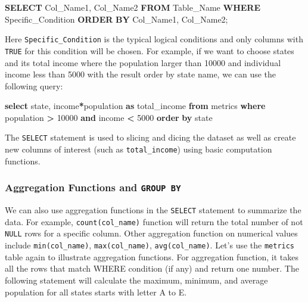 \documentclass[
  12pt,
]{krantz}
\makeatletter
\newenvironment{Shaded}{\begin{snugshade}}{\end{snugshade}}
\newcommand{\DecValTok}[1]{\textcolor[rgb]{0.06,0.06,0.06}{#1}}
\newcommand{\KeywordTok}[1]{\textcolor[rgb]{0.27,0.27,0.27}{\textbf{#1}}}
\newcommand{\NormalTok}[1]{#1}
\newcommand{\OperatorTok}[1]{\textcolor[rgb]{0.43,0.43,0.43}{\textbf{#1}}}
\newenvironment{kframe}{%
\medskip{}
\setlength{\fboxsep}{.8em}
 \def\at@end@of@kframe{}%
 \ifinner\ifhmode%
  \def\at@end@of@kframe{\end{minipage}}%
  \begin{minipage}{\columnwidth}%
 \fi\fi%
 \def\FrameCommand##1{\hskip\@totalleftmargin \hskip-\fboxsep
 \colorbox{shadecolor}{##1}\hskip-\fboxsep
     \hskip-\linewidth \hskip-\@totalleftmargin \hskip\columnwidth}%
 \MakeFramed {\advance\hsize-\width
   \@totalleftmargin\z@ \linewidth\hsize
   \@setminipage}}%
 {\par\unskip\endMakeFramed%
 \at@end@of@kframe}
\renewenvironment{Shaded}{\begin{kframe}}{\end{kframe}}
\makeatother
\begin{document}
\begin{Shaded}
\begin{Highlighting}[]
\KeywordTok{SELECT}\NormalTok{ Col\_Name1, Col\_Name2}
\KeywordTok{FROM}\NormalTok{ Table\_Name}
\KeywordTok{WHERE}\NormalTok{ Specific\_Condition}
\KeywordTok{ORDER} \KeywordTok{BY}\NormalTok{ Col\_Name1, Col\_Name2;}
\end{Highlighting}
\end{Shaded}

Here \texttt{Specific\_Condition} is the typical logical conditions and only columns with \texttt{TRUE} for this condition will be chosen. For example, if we want to choose states and its total income where the population larger than 10000 and individual income less than 5000 with the result order by state name, we can use the following query:

\begin{Shaded}
\begin{Highlighting}[]
\KeywordTok{select}\NormalTok{ state, income}\OperatorTok{*}\NormalTok{population }\KeywordTok{as}\NormalTok{ total\_income}
\KeywordTok{from}\NormalTok{ metrics}
\KeywordTok{where}\NormalTok{ population }\OperatorTok{\textgreater{}} \DecValTok{10000} \KeywordTok{and}\NormalTok{ income }\OperatorTok{\textless{}} \DecValTok{5000}
\KeywordTok{order} \KeywordTok{by}\NormalTok{ state}
\end{Highlighting}
\end{Shaded}

The \texttt{SELECT} statement is used to slicing and dicing the dataset as well as create new columns of interest (such as \texttt{total\_income}) using basic computation functions.

\hypertarget{aggregation-functions-and-group-by}{%
\subsubsection{\texorpdfstring{Aggregation Functions and \texttt{GROUP\ BY}}{Aggregation Functions and GROUP BY}}\label{aggregation-functions-and-group-by}}

We can also use aggregation functions in the \texttt{SELECT} statement to summarize the data. For example, \texttt{count(col\_name)} function will return the total number of not \texttt{NULL} rows for a specific column. Other aggregation function on numerical values include \texttt{min(col\_name)}, \texttt{max(col\_name)}, \texttt{avg(col\_name)}. Let's use the \texttt{metrics} table again to illustrate aggregation functions. For aggregation function, it takes all the rows that match WHERE condition (if any) and return one number. The following statement will calculate the maximum, minimum, and average population for all states starts with letter A to E.
\end{document}

